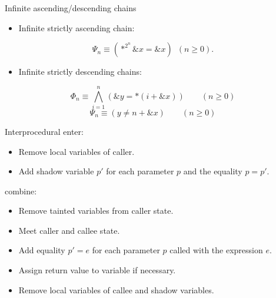 \documentclass[aspectratio=169]{beamer}
\begin{document}
\begin{frame}{Infinite ascending/descending chains}
    \begin{itemize}
        \item Infinite strictly ascending chain:
    \end{itemize}
    \[
        \Psi_n \equiv (*^{2^n} \&x = \&x)\hspace{6pt} (n\geq 0).
    \]
    \begin{itemize}
        \item Infinite strictly descending chains:
    \end{itemize}
    \[
        \Phi_n \equiv\bigwedge_{i=1}^n (\&y = *(i+\&x))\qquad(n\geq 0)
    \]
    \[
        \Psi_n \equiv (y\neq n+\&x)\qquad(n\geq 0)
    \]
\end{frame}

\begin{frame}{Interprocedural}
    enter:
    \begin{itemize}
        \item Remove local variables of caller.
        \item Add shadow variable $p'$ for each parameter $p$ and the equality $p = p'$.
    \end{itemize}
    combine:
    \begin{itemize}
        \item Remove tainted variables from caller state.
        \item Meet caller and callee state.
        \item Add equality $p' = e$ for each parameter $p$ called with the expression $e$.
        \item Assign return value to variable if necessary.
        \item Remove local variables of callee and shadow variables.
    \end{itemize}
\end{frame}
\end{document}
